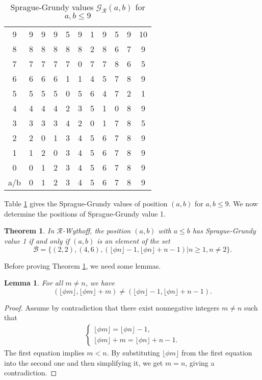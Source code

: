 \documentclass[12pt]{amsart}
\theoremstyle{plain}
\newtheorem{lemma}[proposition]{Lemma}
\newtheorem{theorem}[proposition]{Theorem}
\theoremstyle{definition}
\theoremstyle{remark}
\begin{document}
\begin{table}[ht]
\begin{center}
\begin{tabular}{c|cccccccccc}
9     &9&9&9 &5 &9 &1 &9 &5 &9 &10 \\
8     &8&8&8 &8 &8 &2 &8 &6 &7 &9 \\
7     &7&7&7 &7 &0 &7 &7 &8 &6 &5 \\
6     &6&6&6 &1 &1 &4 &5 &7 &8 &9 \\
5     &5&5&5 &0 &5 &6 &4 &7 &2 &1 \\
4     &4&4&4 &2 &3 &5 &1 &0 &8 &9\\
3     &3&3&3 &4 &2 &0 &1 &7 &8 &5 \\
2     &2&0&1 &3 &4 &5 &6 &7 &8 &9 \\
1     &1&2&0 &3 &4 &5 &6 &7 &8 &9 \\
0     &0&1&2 &3 &4 &5 &6 &7 &8 &9 \\
\hline
a/b &0&1&2&3&4&5&6&7&8&9
 \end{tabular}
\caption{Sprague-Grundy values ${\mathcal{G}}_{\mathcal{R}}(a,b)$ for $a,b\leq 9$}\label{T1}
\end{center}
\end{table}

Table \ref{T1} gives the  Sprague-Grundy values of position $(a,b)$ for $a,b\leq 9$. We now determine the positions of Sprague-Grundy value 1.

\smallskip
\begin{theorem} \label{BW-V1}
In ${\mathcal{R}}$-Wythoff, the position $(a,b)$ with $a \leq b$ has Sprague-Grundy value 1 if and only if $(a,b)$ is an element of the set
\[{\mathcal{B}} = \{(2,2), (4,6), (\lfloor \phi n \rfloor - 1, \lfloor \phi n \rfloor +n-1) | n \geq 1, n \neq 2\}. \]
\end{theorem}

\smallskip
Before proving Theorem \ref{BW-V1}, we need some lemmas. 
\smallskip
\begin{lemma} \label{A-B}
For all $m \neq n$, we have
\[(\lfloor \phi m \rfloor, \lfloor \phi m \rfloor +m) \neq (\lfloor \phi n \rfloor - 1, \lfloor \phi n \rfloor +n-1).\]
\end{lemma}
\begin{proof}
Assume by contradiction that there exist nonnegative integers $m \neq n$ such that
\begin{align*}
\begin{cases}
\lfloor \phi m \rfloor = \lfloor \phi n \rfloor - 1,\\
\lfloor \phi m \rfloor + m = \lfloor \phi n \rfloor +n-1.
\end{cases}
\end{align*}
The first equation implies $m < n$. By substituting $\lfloor \phi m \rfloor$ from the first equation into the second one and then simplifying it, we get $m = n$, giving a contradiction.
\end{proof}
\end{document}
